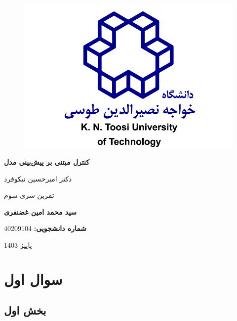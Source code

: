 \documentclass[14pt, a4paper]{extarticle}
\begin{document}
\newpage
	\begin{titlepage}
	\centering
	\begin{figure}
		\centering
		\includegraphics[scale = 0.4]{kn-toosi.png}
	\end{figure}
	{\Huge \textbf{کنترل مبتنی بر پیش‌بینی مدل}}
	\par
	\vspace{0.5cm}
	
	{\large دکتر امیرحسین نیکوفرد}\par\vspace{1cm}
		\vspace{1cm}
	
	{\LARGE تمرین سری سوم}
	\par
	\vspace{3cm}
	
	{\LARGE \textbf{سید محمد امین غضنفری}}
	\par
	\vspace{1cm}
	
	\textbf{شماره دانشجویی:}
	{\large 40209104}
	\vspace{4cm}
	
	{\Large پاییز 1403}

	\end{titlepage}

\newpage

\tableofcontents

\newpage

\section{سوال اول}
\subsection{بخش اول}
\end{document}
